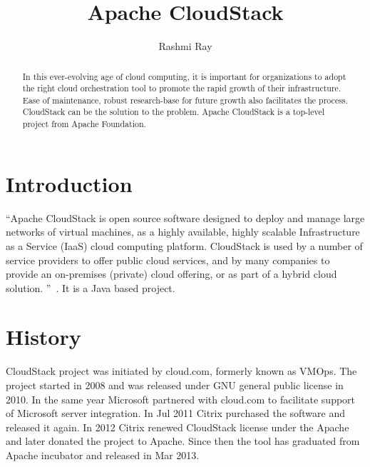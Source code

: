 
\title{Apache CloudStack}


\author{Rashmi Ray}


\renewcommand{\shortauthors}{G. v. Laszewski}


\begin{abstract}

  In this ever-evolving age of cloud computing, it is important for
  organizations to adopt the right cloud orchestration tool to promote
  the rapid growth of their infrastructure. Ease of maintenance, 
  robust research-base for future growth
  also facilitates the process. CloudStack can be the solution to 
  the problem. Apache CloudStack is a top-level project from Apache Foundation.

\end{abstract}


\maketitle

\section{Introduction}

``Apache CloudStack is open source software designed to deploy and
manage large networks of virtual machines, as a highly available,
highly scalable Infrastructure as a Service (IaaS) cloud computing
platform. CloudStack is used by a number of service providers to offer
public cloud services, and by many companies to provide an on-premises
(private) cloud offering, or as part of a hybrid cloud
solution. ''~\cite{hid-sp18-417-www-cloudstack-intro}. It is a Java based project.


\section{History}

CloudStack project was initiated by cloud.com, formerly known as
VMOps.  The project started in 2008 and was released under GNU general
public license in 2010.  In the same year Microsoft partnered with cloud.com to 
facilitate support of Microsoft server integration. 
In Jul 2011 Citrix purchased the software and
released it again. In 2012 Citrix renewed CloudStack license under
the Apache and later donated the project to Apache.  Since then the
tool has graduated from Apache incubator and released in Mar 2013.


